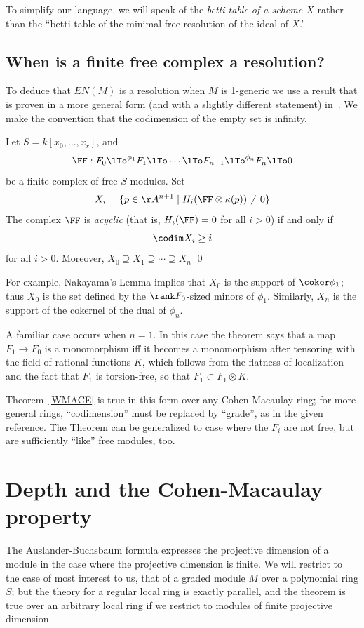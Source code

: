 To simplify our language, we will speak of the \emph{betti table of a scheme $X$} rather than the ``betti table of the minimal free resolution of the ideal of $X$.'

\subsection{When is a finite free complex a resolution?}
To deduce that $EN(M)$ is a resolution when $M$ is 1-generic we use
a result that is proven in a more general form (and with a slightly different statement) 
in~\cite[Theorem 20.9]{Eisenbud1995}. We make the convention
that the codimension of the empty set is infinity.

\begin{theorem}\label{WMACE}
 Let $S = k[x_0,\dots, x_r]$, and
 $$ 
\FF:  F_0\lTo^{\phi_1}F_1 \lTo \cdots \lTo F_{n-1}\lTo^{\phi_n} F_n\lTo 0
 $$
be a finite complex of free $S$-modules. Set
$$
X_i = \{p\in \AA^{n+1} \mid  H_i(\FF \otimes \kappa(p)) \neq 0\}
$$
The complex $\FF$ is \emph{acyclic} (that is, $H_i(\FF) = 0$ for all $i>0$) if and only if
$$
\codim X_i \geq i
$$
for all $i>0$. Moreover, $X_{0}\supseteq X_{1}\supseteq \cdots \supseteq X_{n}$
\qed
\end{theorem}

For example, Nakayama's Lemma implies that $X_{0}$ is the support of $\coker \phi_{1}$; thus $X_{0}$ is the set defined by the $\rank F_{0}$-sized minors of $\phi_{1}$. Similarly, 
$X_{n}$ is the support of the cokernel of the dual of $\phi_{n}$. 

A familiar case occurs when  $n=1$. In this case the theorem says that a map $F_1\to F_0$ is a monomorphism iff it becomes a monomorphism after tensoring with the field of rational functions $K$, which follows from the flatness of
localization and the fact that $F_1$ is torsion-free, so that
$F_1 \subset F_1 \otimes K$. 

\begin{fact}
Theorem~\ref{WMACE} is true in this form over any Cohen-Macaulay ring; for more general
rings, ``codimension'' must be replaced by ``grade'', as in the given reference.
The Theorem can be generalized
to case where the $F_i$ are not free, but are sufficiently ``like'' free modules, too.
\end{fact}


\section{Depth and the Cohen-Macaulay property}
The Auslander-Buchsbaum formula expresses the projective dimension of a module in the case where the projective dimension is finite. We will restrict to the case of most interest to us, that of a graded module $M$ over a polynomial ring $S$; but the
theory for a regular local ring is exactly parallel, and the theorem is true over an arbitrary local ring if we restrict to modules of finite projective dimension.

